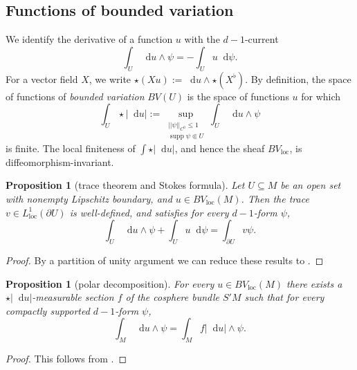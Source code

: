 \documentclass[reqno,11pt]{amsart}
\DeclareMathOperator{\supp}{supp}
\newcommand*\dif{\mathop{}\!\mathrm{d}}
\newcommand{\vol}{\mathrm{vol}}
\newcommand{\dfn}[1]{\emph{#1}\index{#1}}
\newcommand{\loc}{\mathrm{loc}}
\newtheorem{proposition}[theorem]{Proposition}
\theoremstyle{definition}
\numberwithin{equation}{section}
\begin{document}

\subsection{Functions of bounded variation}
We identify the derivative of a function $u$ with the $d-1$-current
$$\int_U \dif u \wedge \psi = -\int_U u \dif \psi.$$
For a vector field $X$, we write $\star (Xu) := \dif u \wedge \star (X^\flat)$.
By definition, the space of functions of \dfn{bounded variation} $BV(U)$ is the space of functions $u$ for which
\begin{equation}\label{total variation}
\int_U \star |\dif u| := \sup_{\substack{||\psi||_{C^0} \leq 1\\\supp \psi \Subset U}} \int_U \dif u \wedge \psi
\end{equation}
is finite.
The local finiteness of $\int \star |\dif u|$, and hence the sheaf $BV_\loc$, is diffeomorphism-invariant.

\begin{proposition}[trace theorem and Stokes formula]
Let $U \subseteq M$ be an open set with nonempty Lipschitz boundary, and $u \in BV_\loc(M)$.
Then the trace $v \in L^1_\loc(\partial U)$ is well-defined,
and satisfies for every $d - 1$-form $\psi$,
\begin{equation}\label{Miranda IBP}
\int_U \dif u \wedge \psi + \int_U u \dif \psi = \int_{\partial U} v\psi.
\end{equation}
\end{proposition}
\begin{proof}
By a partition of unity argument we can reduce these results to \cite[Teorema 1]{Miranda67}.
\end{proof}

\begin{proposition}[polar decomposition]
For every $u \in BV_\loc(M)$ there exists a $\star |\dif u|$-measurable section $f$ of the cosphere bundle $S'M$ such that for every compactly supported $d-1$-form $\psi$,
\begin{equation}\label{RNy formula}
\int_M \dif u \wedge \psi = \int_M f|\dif u| \wedge \psi.
\end{equation}
\end{proposition}
\begin{proof}
This follows from \cite[Theorem 4.14]{simon1983GMT}.
\end{proof}
\end{document}
